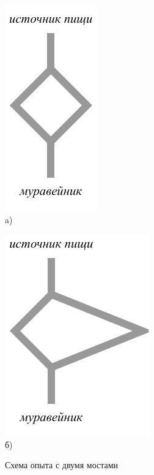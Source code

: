 




\begin{figure}

\begin{minipage}{.49\textwidth}
	\centering
	\includegraphics{inc/img/ant1.pdf} \\a)
  \end{minipage}
  \begin{minipage}{.49\textwidth}
	\centering
	\includegraphics{inc/img/ant2.pdf} \\б)
  \end{minipage}
	\caption{Схема опыта с двумя мостами}  
	\label{fig:ant}
  
\end{figure}

